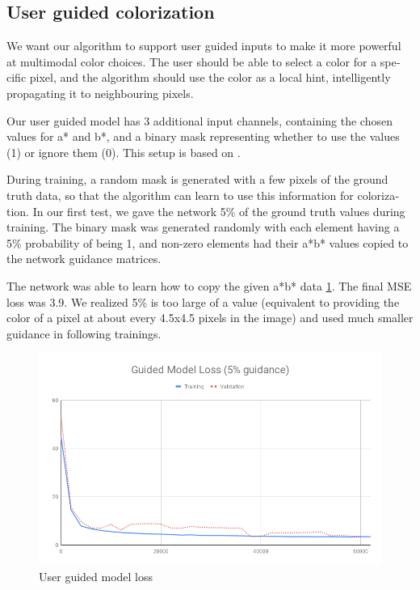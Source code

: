 \documentclass[12pt,openright,oneside,a4paper,english]{abntex2}
\begin{document}
\begin{otherlanguage}{english}
\subsection{User guided colorization}
We want our algorithm to support user guided inputs to make it more powerful at multimodal color choices. The user should be able to select a color for a specific pixel, and the algorithm should use the color as a local hint, intelligently propagating it to neighbouring pixels.

Our user guided model has 3 additional input channels, containing the chosen values for a* and b*, and a binary mask representing whether to use the values (1) or ignore them (0). This setup is based on \cite{Zhang2017}.

During training, a random mask is generated with a few pixels of the ground truth data, so that the algorithm can learn to use this information for colorization. In our first test, we gave the network 5\% of the ground truth values during training. The binary mask was generated randomly with each element having a 5\% probability of being 1, and non-zero elements had their a*b* values copied to the network guidance matrices.

The network was able to learn how to copy the given a*b* data \ref{loss_5}. The final MSE loss was 3.9. We realized 5\% is too large of a value (equivalent to providing the color of a pixel at about every 4.5x4.5 pixels in the image) and used much smaller guidance in following trainings.

\begin{figure}[!htb]
\centering
\includegraphics[width=\textwidth]{loss/Guided_5}
\caption{User guided model loss}
\label{loss_5}
\end{figure}


\end{otherlanguage}
\end{document}
